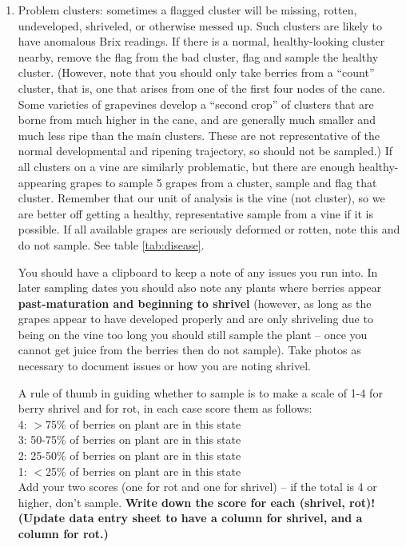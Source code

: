 \documentclass[11pt,letter]{article}
\begin{document}
\begin{enumerate}
\item Problem clusters: sometimes a flagged cluster will be missing, rotten, undeveloped, shriveled, or otherwise messed up. Such clusters are likely to have anomalous Brix readings. If there is a normal, healthy-looking cluster nearby, remove the flag from the bad cluster, flag and sample the healthy cluster. (However, note that you should only take berries from a “count” cluster, that is, one that arises from one of the first four nodes of the cane. Some varieties of grapevines develop a “second crop” of clusters that are borne from much higher in the cane, and are generally much smaller and much less ripe than the main clusters. These are not representative of the normal developmental and ripening trajectory, so should not be sampled.)  If all clusters on a vine are similarly problematic, but there are enough healthy-appearing grapes to sample 5 grapes from a cluster, sample and flag that cluster. Remember that our unit of analysis is the vine (not cluster), so we are better off getting a healthy, representative sample from a vine if it is possible. If all available grapes are seriously deformed or rotten, note this and do not sample. See table \ref{tab:disease}.


You should have a clipboard to keep a note of any issues you run into. In later sampling dates you should also note any plants where berries appear {\bf past-maturation and beginning to shrivel} (however, as long as the grapes appear to have developed properly and are only shriveling due to being on the vine too long you should still sample the plant -- once you cannot get juice from the berries then do not sample). Take photos as necessary to document issues or how you are noting shrivel.

A rule of thumb in guiding whether to sample is to make a scale of 1-4 for berry shrivel and for rot, in each case score them as follows: \\
4: $>$75\% of berries on plant are in this state \\
3: 50-75\% of berries on plant are in this state \\
2: 25-50\% of berries on plant are in this state \\
1: $<$25\% of berries on plant are in this state \\
Add your two scores (one for rot and one for shrivel) -- if the total is 4 or higher, don't sample. {\bf Write down the score for each (shrivel, rot)! (Update data entry sheet to have a column for shrivel, and a column for rot.)}


\end{enumerate}
\end{document}
